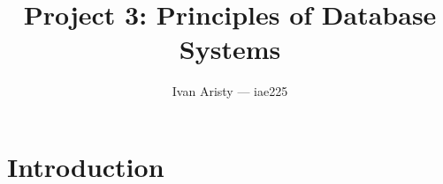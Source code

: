 \documentclass{article}
\title{Project 3: Principles of Database Systems}
\author{Ivan Aristy — iae225}
\begin{document}
  \maketitle %
  \thispagestyle{empty}
  \vspace{+5pt}

\section{Introduction}
\label{sec:intro}


\begin{refcontext}[sorting=nyt]
\printbibliography
\end{refcontext}
\end{document}
